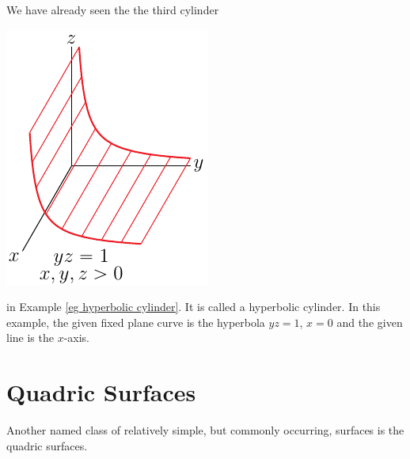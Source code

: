 \begin{eg}
We have already seen the the third cylinder 
\begin{efig}
\begin{center}
   \includegraphics{hyperbolicCylinderD.pdf}
\end{center}
\end{efig}
in Example \ref{eg hyperbolic cylinder}. It is called a hyperbolic cylinder.
In this example, the given fixed plane curve is the hyperbola $yz=1$, $x=0$
and the given line is the $x$-axis.
\end{eg}


\section{Quadric Surfaces}\label{sec quadrics}


Another named class of relatively simple, but commonly occurring, 
surfaces is the quadric surfaces.

